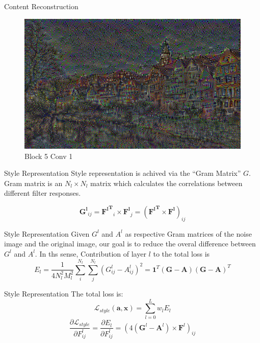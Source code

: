 \documentclass{beamer}
\begin{document}
\begin{frame}{Content Reconstruction}
\begin{figure}[ht]
\centering
\caption{Block 5 Conv 1}
\includegraphics[width=\textwidth]{img/content/block5_conv1.png}
\end{figure}
\end{frame}

\begin{frame}{Style Representation}
Style representation is achived via the ``Gram Matrix'' $G$. Gram matrix is
an $N_l \times N_l$ matrix which calculates the correlations between
different filter responses.

\begin{equation}
    \mathbf{G^l}_{ij} = \mathbf{{F^l}^T}_i \times \mathbf{F^l}_j
    = (\mathbf{{F^l}^T} \times \mathbf{F^l})_{ij}
\end{equation}
\end{frame}

\begin{frame}{Style Representation}
Given $G^l$ and $A^l$ as respective Gram matrices of the
noise image and the original image, our goal is to reduce the overal difference
between $G^l$ and $A^l$. In ths sense,
Contribution of layer $l$ to the total loss is
\begin{equation}
    E_l = \frac{1}{4N_l^2M_l^2} \sum_{i}^{N_l}\sum_{j}^{N_l}{(G^l_{ij} - A^l_{ij})^2}
    = \mathbf{1}^T(\mathbf{G} - \mathbf{A})(\mathbf{G} - \mathbf{A})^T
\end{equation}
\end{frame}

\begin{frame}{Style Representation}
The total loss is:
\begin{equation}
    \mathcal{L}_{style}(\mathbf{a}, \mathbf{x}) = \sum_{l=0}^L {w_l E_l }
\end{equation}
\begin{equation}
    \frac{\partial \mathcal{L}_{style}}{\partial F^l_{ij}} = \frac{\partial E_l}{\partial F^l_{ij}} =
    (4(\mathbf{G}^l - \mathbf{A}^l) \times \mathbf{F}^l)_{ij}
\end{equation}
\end{frame}
\end{document}
